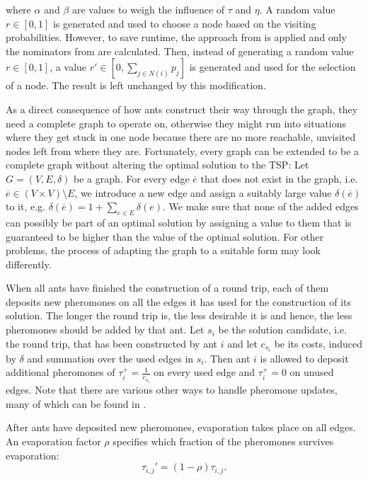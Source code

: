 \vspace*{-0.5em}
where $\alpha$ and $\beta$ are values to weigh the influence of $\tau$ and $\eta$. A random value $r \in \left[0, 1 \right]$ is generated and used to choose a node based on the visiting probabilities. However, to save runtime, the approach from \cite{Bloecker} is applied and only the nominators from  are calculated. Then, instead of generating a random value $r \in \left[0, 1 \right]$, a value $r' \in \left[0, \sum_{j \in N \left( i \right)} p_j \right]$ is generated and used for the selection of a node. The result is left unchanged by this modification.

As a direct consequence of how ants construct their way through the graph, they need a complete graph to operate on, otherwise they might run into situations where they get stuck in one node because there are no more reachable, unvisited nodes left from where they are. Fortunately, every graph can be extended to be a complete graph without altering the optimal solution to the \textsc{TSP}: Let $G = \left( V, E, \delta \right)$ be a graph. For every edge $\overline{e}$ that does not exist in the graph, i.e. $\overline{e} \in \left( V \times V \right) \setminus E$, we introduce a new edge and assign a suitably large value $\delta \left( \overline{e} \right)$ to it, e.g. $\delta \left( \overline{e} \right) = 1 + \sum_{e \in E} \delta \left( e \right)$. We make sure that none of the added edges can possibly be part of an optimal solution by assigning a value to them that is guaranteed to be higher than the value of the optimal solution. For other problems, the process of adapting the graph to a suitable form may look differently.


When all ants have finished the construction of a round trip, each of them deposits new pheromones on all the edges it has used for the construction of its solution. The longer the round trip is, the less desirable it is and hence, the less pheromones should be added by that ant. Let $s_i$ be the solution candidate, i.e. the round trip, that has been constructed by ant $i$ and let $c_{s_i}$ be its costs, induced by $\delta$ and summation over the used edges in $s_i$. Then ant $i$ is allowed to deposit additional pheromones of $\tau_i^+ = \frac{1}{c_{s_i}}$ on every used edge and $\tau_i^+ = 0$ on unused edges. Note that there are various other ways to handle pheromone updates, many of which can be found in \cite{Dorigo:2004:ACO:975277}.

After ants have deposited new pheromones, evaporation takes place on all edges. An evaporation factor $\rho$ specifies which fraction of the pheromones survives evaporation:
\vspace*{-0.5em}
\begin{equation}
  \label{eqn:evaporation}
  \tau_{i,j}' = \left( 1 - \rho \right) \tau_{i,j}.
\end{equation}

